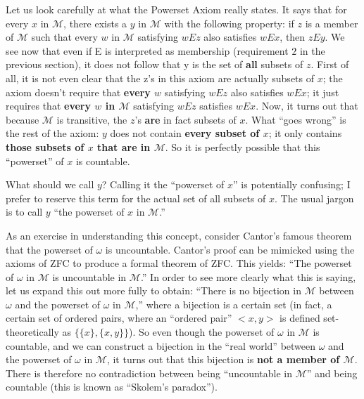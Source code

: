 \documentclass[10pt]{article}
\newcommand\axiom[1]{\textmd{#1}}
\theoremstyle{definition}
\begin{document}
Let us look carefully at what the Powerset Axiom really states. It says that for every $x$ in $\mathcal M$, there exists a $y$ in $\mathcal{M}$ with the following property: if $z$ is a member of $\mathcal{M}$ such that every $w$ in $\mathcal{M}$ satisfying $w E z$ also satisfies $w E x$, then $z E y$. We see now that even if E is interpreted as membership (requirement $2$ in the previous section), it does not follow that y is the set of \textbf{all} subsets of $z$. First of all, it is not even clear that the z's in this axiom are actually subsets of $x$; the axiom doesn't require that \textbf{every $w$} satisfying $w E z$ also satisfies $w E x$; it just requires that \textbf{every $w$ in $\mathcal M$} satisfying $w E z$ satisfies $w E x$. Now, it turns out that because $\mathcal{M}$ is transitive, the $z$'s \textbf{are} in fact subsets of $x$. What ``goes wrong'' is the rest of the axiom: $y$ does not contain \textbf{every subset of $x$}; it only contains \textbf{those subsets of $x$ that are in $\mathcal M$}. So it is perfectly possible that this ``powerset'' of $x$ is countable.

What should we call $y$? Calling it the ``powerset of $x$'' is potentially confusing; I prefer to reserve this term for the actual set of all subsets of $x$. The usual jargon is to call $y$ ``the powerset of $x$ in $\mathcal M$.''

As an exercise in understanding this concept, consider Cantor's famous theorem that the powerset of $\omega$ is uncountable. Cantor's proof can be mimicked using the axioms of \axiom{ZFC} to produce a formal theorem of \axiom{ZFC}. This yields: ``The powerset of $\omega$ in $\mathcal{M}$ is uncountable in $\mathcal M$.'' In order to see more clearly what this is saying, let us expand this out more fully to obtain: ``There is no bijection in $\mathcal{M}$ between $\omega$ and the powerset of $\omega$ in $\mathcal M$,'' where a bijection is a certain set (in fact, a certain set of ordered pairs, where an ``ordered pair'' $<x,y>$ is defined set-theoretically as $\{\{x\}, \{x,y\}\}$). So even though the powerset of $\omega$ in $\mathcal{M}$ is countable, and we can construct a bijection in the ``real world'' between $\omega$ and the powerset of $\omega$ in $\mathcal M$, it turns out that this bijection is \textbf{not a member of $\mathcal M$}. There is therefore no contradiction between being ``uncountable in $\mathcal M$'' and being countable (this is known as ``Skolem's paradox'').
\end{document}
